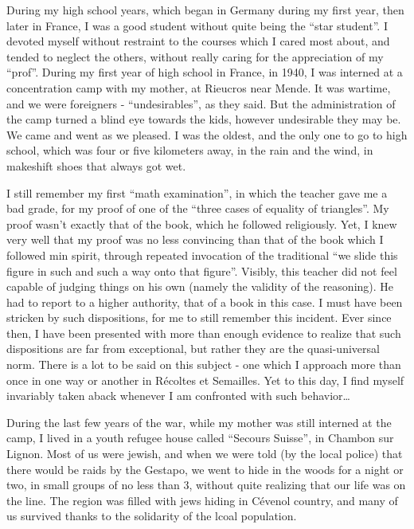 During my high school years, which began in Germany during my first year, then later in
France, I was a good student without quite being the ``star student''.
I devoted myself without restraint to the
courses which I cared most about, and tended to neglect the others, without really caring
for the appreciation of my ``prof''. 
During my first year of high school in France, in 1940, I was interned at a concentration
camp with my mother, at Rieucros near Mende. It was wartime, and we were foreigners -
``undesirables'', as they said. But the administration of the camp turned a blind eye
towards the kids, however undesirable they may be. We came and went as we pleased. 
I was the oldest, and the only one to go to high school, which was four or five kilometers
away, in the rain and the wind, in makeshift shoes 
that always got wet. 

I still remember my first ``math examination'', in which the teacher gave me a bad grade,
for my proof of one of the ``three cases of equality of triangles''. 
My proof wasn't exactly that of the book, which he followed religiously. 
Yet, I knew very well that my proof was no less convincing than that of the book which I
followed min spirit, through repeated invocation of the traditional
``we slide this figure in such and such a way onto that figure''. 
Visibly, this teacher did not feel capable of judging things on his own (namely the
validity of the reasoning). He had to report to a higher authority, that of a book in this
case. I must have been stricken by such dispositions, for me to still remember this
incident. Ever since then, I have been presented with more than enough evidence to realize
that such dispositions are far from exceptional, but rather they are the quasi-universal
norm. There is a lot to be said on this subject - one which I approach more than once in
one way or another in 
R\'ecoltes et Semailles. Yet to this day, I find myself invariably 
taken aback whenever I am confronted with such behavior\ldots

During the last few years of the war, while my mother was still interned at the camp, I
lived in a youth refugee house called ``Secours Suisse'', in Chambon sur Lignon. Most of
us were jewish, and when we were told (by the local police) that there would be raids by
the Gestapo, we went to hide in the woods for a night or two, in small groups of no less
than 3, without quite realizing that our life was on the line.
The region was filled with jews hiding in C\'evenol country, and many of us survived
thanks to the solidarity of the lcoal population.

